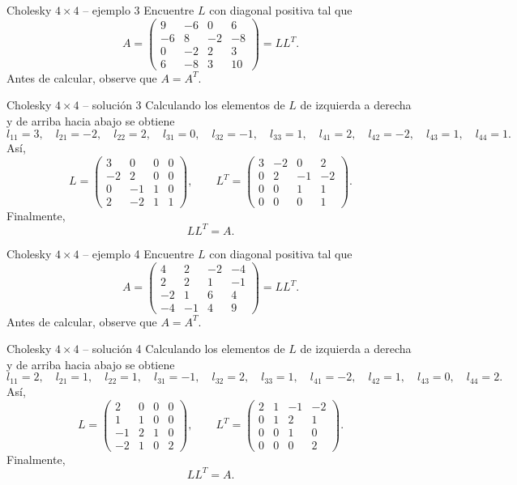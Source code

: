 \documentclass[aspectratio=169,10pt]{beamer}
\begin{document}
\begin{frame}{Cholesky $4\times 4$ -- ejemplo 3}
\small
Encuentre $L$ con diagonal positiva tal que
\[
A=\begin{pmatrix}9 & -6 & 0 & 6\\-6 & 8 & -2 & -8\\0 & -2 & 2 & 3\\6 & -8 & 3 & 10\end{pmatrix}=LL^T.
\]
Antes de calcular, observe que $A=A^T$.
\end{frame}
\begin{frame}{Cholesky $4\times 4$ -- solución 3}
\small
Calculando los elementos de $L$ de izquierda a derecha y de arriba hacia abajo se obtiene
\[
l_{11}=3,\quad l_{21}=-2,\quad l_{22}=2,\quad l_{31}=0,\quad l_{32}=-1,\quad l_{33}=1,\quad l_{41}=2,\quad l_{42}=-2,\quad l_{43}=1,\quad l_{44}=1.
\]
Así,
\[
L=\begin{pmatrix}3 & 0 & 0 & 0\\-2 & 2 & 0 & 0\\0 & -1 & 1 & 0\\2 & -2 & 1 & 1\end{pmatrix},\qquad L^T=\begin{pmatrix}3 & -2 & 0 & 2\\0 & 2 & -1 & -2\\0 & 0 & 1 & 1\\0 & 0 & 0 & 1\end{pmatrix}.
\]
Finalmente,
\[
\boxed{LL^T=A}.
\]
\end{frame}
\begin{frame}{Cholesky $4\times 4$ -- ejemplo 4}
\small
Encuentre $L$ con diagonal positiva tal que
\[
A=\begin{pmatrix}4 & 2 & -2 & -4\\2 & 2 & 1 & -1\\-2 & 1 & 6 & 4\\-4 & -1 & 4 & 9\end{pmatrix}=LL^T.
\]
Antes de calcular, observe que $A=A^T$.
\end{frame}
\begin{frame}{Cholesky $4\times 4$ -- solución 4}
\small
Calculando los elementos de $L$ de izquierda a derecha y de arriba hacia abajo se obtiene
\[
l_{11}=2,\quad l_{21}=1,\quad l_{22}=1,\quad l_{31}=-1,\quad l_{32}=2,\quad l_{33}=1,\quad l_{41}=-2,\quad l_{42}=1,\quad l_{43}=0,\quad l_{44}=2.
\]
Así,
\[
L=\begin{pmatrix}2 & 0 & 0 & 0\\1 & 1 & 0 & 0\\-1 & 2 & 1 & 0\\-2 & 1 & 0 & 2\end{pmatrix},\qquad L^T=\begin{pmatrix}2 & 1 & -1 & -2\\0 & 1 & 2 & 1\\0 & 0 & 1 & 0\\0 & 0 & 0 & 2\end{pmatrix}.
\]
Finalmente,
\[
\boxed{LL^T=A}.
\]
\end{frame}
\end{document}
